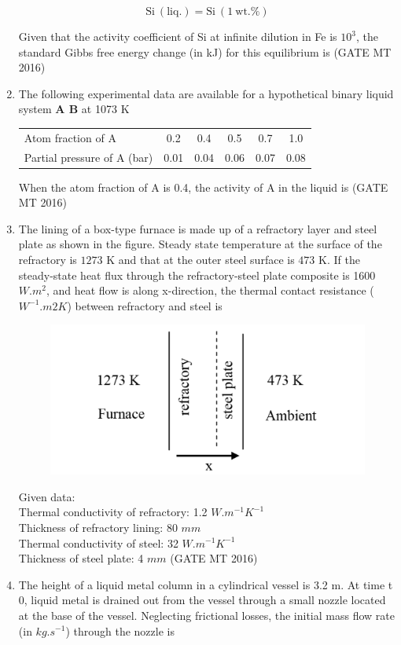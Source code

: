 \documentclass[11pt, letterpaper]{article}
\theoremstyle{remark}
\begin{document}
\begin{enumerate}
$$\mathrm{Si\ (liq.)} = \mathrm{Si\ (1\ wt.\%)}$$

Given that the activity coefficient of Si at infinite dilution in Fe is $10^{3}$, the standard Gibbs free energy change (in kJ) for this equilibrium is 
\hfill(GATE MT 2016)

\item The following experimental data are available for a hypothetical binary liquid system \textbf{A B} at 1073 K

\begin{tabular}{lccccc}
Atom fraction of A & 0.2 & 0.4 & 0.5 & 0.7 & 1.0 \\
Partial pressure of A (bar) & 0.01 & 0.04 & 0.06 & 0.07 & 0.08 \\
\end{tabular}

When the atom fraction of A is 0.4, the activity of A in the liquid is 
\hfill(GATE MT 2016)

\item The lining of a box-type furnace is made up of a refractory layer and steel plate as shown in the figure. Steady state temperature at the surface of the refractory is $1273$ K and that at the outer steel surface is $473$ K. If the steady-state heat flux through the refractory-steel plate composite is 1600 $W.m^2$, and heat flow is along x-direction, the thermal contact resistance ($W^{-1}.m2K$) between refractory and steel is
\begin{figure}[H]
    \centering
    \includegraphics[width=0.5\linewidth]{figs/image4'.png}
    \caption{}
    \label{fig:placeholder}
\end{figure}

    Given data:\\
    Thermal conductivity of refractory: 1.2 $W.m^{-1}K^{-1}$\\
    Thickness of refractory lining: 80 $mm$\\
    Thermal conductivity of steel: 32 $W.m^{-1}K^{-1}$\\
    Thickness of steel plate: 4 $mm$
\hfill(GATE MT 2016)

\item The height of a liquid metal column in a cylindrical vessel is 3.2 m. At time t 0, liquid metal is drained out from the vessel through a small nozzle located at the base of the vessel. Neglecting frictional losses, the initial mass flow rate (in $kg.s^{-1}$) through the nozzle is 



\end{enumerate}
\end{document}
